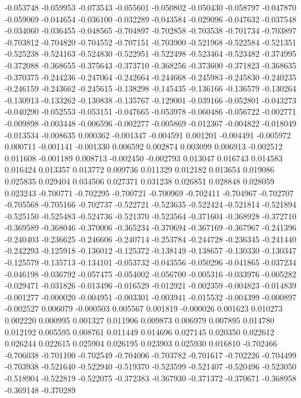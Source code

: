 -0.053748
-0.059953
-0.073543
-0.055601
-0.050802
-0.050430
-0.058797
-0.047870
-0.059069
-0.044654
-0.036100
-0.032289
-0.043584
-0.029096
-0.047632
-0.037548
-0.034060
-0.036455
-0.048565
-0.704897
-0.702858
-0.703538
-0.701734
-0.703897
-0.703812
-0.704820
-0.704552
-0.707151
-0.703900
-0.521968
-0.522584
-0.521351
-0.525238
-0.524163
-0.524830
-0.522951
-0.522498
-0.523464
-0.523482
-0.374995
-0.372088
-0.368655
-0.375643
-0.373710
-0.368256
-0.373600
-0.371823
-0.368635
-0.370375
-0.244236
-0.247064
-0.242664
-0.244668
-0.245983
-0.245830
-0.240235
-0.246159
-0.243662
-0.245615
-0.138298
-0.145435
-0.136166
-0.136579
-0.130264
-0.130913
-0.133262
-0.130838
-0.135767
-0.129001
-0.039166
-0.052801
-0.043273
-0.040290
-0.052553
-0.053151
-0.047665
-0.053978
-0.060486
-0.056722
-0.002771
-0.009898
-0.003448
-0.006596
-0.002277
-0.005869
-0.012367
-0.004822
-0.018049
-0.013534
-0.008635
0.000362
-0.001347
-0.004591
0.001201
-0.004491
-0.005972
0.000711
-0.001141
-0.001330
0.006592
0.002874
0.003099
0.006913
-0.002512
0.011608
-0.001189
0.008713
-0.002450
-0.002793
0.013047
0.016743
0.014583
0.016424
0.013357
0.013772
0.009736
0.011329
0.012182
0.013654
0.019086
0.025835
0.029404
0.034506
0.027371
0.031238
0.026851
0.028848
0.028059
0.023243
-0.700771
-0.702295
-0.700721
-0.700969
-0.702411
-0.704967
-0.702707
-0.705568
-0.705166
-0.702737
-0.522721
-0.523635
-0.522424
-0.521814
-0.521894
-0.525150
-0.525483
-0.524736
-0.521370
-0.523564
-0.371604
-0.368928
-0.372710
-0.369589
-0.368046
-0.370006
-0.365234
-0.370694
-0.367169
-0.367967
-0.241396
-0.240403
-0.236625
-0.246606
-0.240714
-0.253784
-0.244728
-0.236345
-0.241440
-0.242293
-0.125918
-0.136012
-0.125372
-0.138149
-0.138657
-0.130330
-0.130347
-0.125579
-0.135713
-0.134101
-0.053732
-0.043556
-0.050296
-0.041865
-0.037234
-0.046198
-0.036792
-0.057475
-0.054002
-0.056700
-0.005316
-0.033976
-0.005282
-0.029471
-0.031826
-0.013496
-0.016529
-0.012921
-0.002359
-0.004823
-0.014839
-0.001277
-0.000020
-0.004951
-0.003301
-0.003941
-0.015532
-0.004399
-0.000897
-0.002527
0.006079
-0.000503
0.005567
0.001819
-0.000026
0.001623
0.010273
0.002220
0.000995
0.001327
0.011906
0.009873
0.006979
0.007895
0.014780
0.012192
0.005595
0.008761
0.011449
0.014696
0.027145
0.020350
0.022612
0.026244
0.022615
0.025904
0.026195
0.023903
0.025930
0.016810
-0.702466
-0.706038
-0.701100
-0.702549
-0.704006
-0.703782
-0.701617
-0.702226
-0.704499
-0.703938
-0.521640
-0.522940
-0.519370
-0.523599
-0.521407
-0.520496
-0.523050
-0.518904
-0.522819
-0.522075
-0.372383
-0.367930
-0.371372
-0.370671
-0.368958
-0.369148
-0.370289

